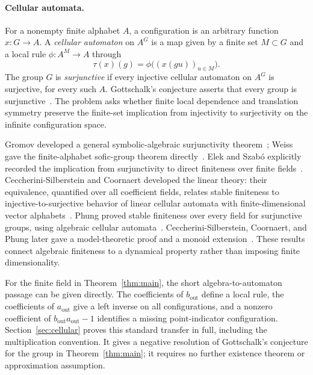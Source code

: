\paragraph{Cellular automata.}
For a nonempty finite alphabet $A$, a configuration is an arbitrary function $x:G\to A$. A \emph{cellular automaton} on $A^G$ is a map given by a finite set $M\subset G$ and a local rule $\phi:A^M\to A$ through
\[
  \tau(x)(g)=\phi\bigl((x(gu))_{u\in M}\bigr).
\]
The group $G$ is \emph{surjunctive} if every injective cellular automaton on $A^G$ is surjective, for every such $A$. Gottschalk's conjecture asserts that every group is surjunctive~\cite{Gottschalk1973}. The problem asks whether finite local dependence and translation symmetry preserve the finite-set implication from injectivity to surjectivity on the infinite configuration space.

Gromov developed a general symbolic-algebraic surjunctivity theorem~\cite[Section~7.G$'$]{Gromov1999}; Weiss gave the finite-alphabet sofic-group theorem directly~\cite[Theorem~3.2]{Weiss2000}. Elek and Szab\'o explicitly recorded the implication from surjunctivity to direct finiteness over finite fields~\cite[Section~1]{ElekSzabo2004}. Ceccherini-Silberstein and Coornaert developed the linear theory: their equivalence, quantified over all coefficient fields, relates stable finiteness to injective-to-surjective behavior of linear cellular automata with finite-dimensional vector alphabets~\cite[Theorem~4.2]{CSCCoornaert2006}. Phung proved stable finiteness over every field for surjunctive groups, using algebraic cellular automata~\cite[Theorem~B]{Phung2023}. Ceccherini-Silberstein, Coornaert, and Phung later gave a model-theoretic proof and a monoid extension~\cite[Theorem~1.1]{CSCPhungGroup2025,CSCPhungMonoid2025}. These results connect algebraic finiteness to a dynamical property rather than imposing finite dimensionality.

For the finite field in Theorem~\ref{thm:main}, the short algebra-to-automaton passage can be given directly. The coefficients of $b_{\mathrm{out}}$ define a local rule, the coefficients of $a_{\mathrm{out}}$ give a left inverse on all configurations, and a nonzero coefficient of $b_{\mathrm{out}}a_{\mathrm{out}}-1$ identifies a missing point-indicator configuration. Section~\ref{sec:cellular} proves this standard transfer in full, including the multiplication convention. It gives a negative resolution of Gottschalk's conjecture for the group in Theorem~\ref{thm:main}; it requires no further existence theorem or approximation assumption.

